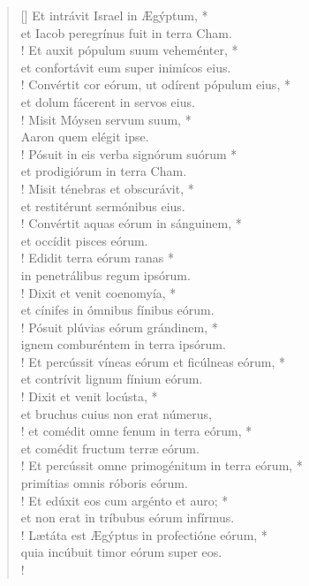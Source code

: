 \begin{verse}[\versewidth]
Et intrávit Israel in Ægýptum, *\\
et Iacob peregrínus fuit in terra Cham.\\!
\vin Et auxit pópulum suum veheménter, *\\
\vin et confortávit eum super inimícos eius.\\!
Convértit cor eórum, ut odírent pópulum eius, *\\
et dolum fácerent in servos eius.\\!
\vin Misit Móysen servum suum, *\\
\vin Aaron quem elégit ipse.\\!
Pósuit in eis verba signórum suórum *\\
et prodigiórum in terra Cham.\\!
\vin Misit ténebras et obscurávit, *\\
\vin et restitérunt sermónibus eius.\\!
Convértit aquas eórum in sánguinem, *\\
et occídit pisces eórum.\\!
\vin Edidit terra eórum ranas *\\
\vin in penetrálibus regum ipsórum.\\!
Dixit et venit coenomyía, *\\
et cínifes in ómnibus fínibus eórum.\\!
\vin Pósuit plúvias eórum grándinem, *\\
\vin ignem comburéntem in terra ipsórum.\\!
Et percússit víneas eórum et ficúlneas eórum, *\\
et contrívit lignum fínium eórum.\\!
\vin Dixit et venit locústa, *\\
\vin et bruchus cuius non erat númerus,\\!
et comédit omne fenum in terra eórum, *\\
et comédit fructum terræ eórum.\\!
\vin Et percússit omne primogénitum in terra eórum, *\\
\vin primítias omnis róboris eórum.\\!
Et edúxit eos cum argénto et auro; *\\
et non erat in tríbubus eórum infírmus.\\!
\vin Lætáta est Ægýptus in profectióne eórum, *\\
\vin quia incúbuit timor eórum super eos.\\!

\end{verse}

